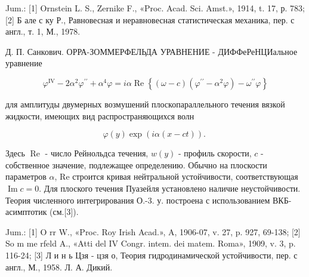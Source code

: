 \documentclass[10pt]{article}
\begin{document}
Jum.: [1] Ornstein L. S., Zernike F., «Proc. Acad. Sci. Amst.», 1914, t. 17, р. 783; [2] Б але с ку Р., Равновесная и неравновесная статистическая механика, пер. с англ., т. 1, М., 1978.



Д. П. Санкович. ОРРА-ЗОММЕРФЕЛЬДА УРАВНЕНИЕ - ДИФФеРеНЦИальное уравнение



\[

\varphi^{\mathrm{IV}}-2 \alpha^{2} \varphi^{\prime \prime}+\alpha^{4} \varphi=i \alpha \operatorname{Re}\left\{(\omega-c)\left(\varphi^{\prime \prime}-\alpha^{2} \varphi\right)-\omega^{\prime \prime} \varphi\right\}

\]



для амплитуды двумерных возмушений плоскопараллельного течения вязкой жидкости, имеющих вид распространяющихся волн



\[

\varphi(y) \exp (i \alpha(x-c t)) \text {. }

\]



Здесь $\operatorname{Re}$ - число Рейнольдса течения, $w(y)$ - профиль скорости, $c$ - собственное значение, подлежащее определению. Обычно на плоскости параметров $\alpha$, Re строится кривая нейтральной устойчивости, соответствующая $\operatorname{Im} c=0$. Для плоского течения Пуазейля установлено наличие неустойчивости. Теория численного интегрирования О.-3. у. построена с использованием ВКБ-асимптотик (см.[3]).



Jum.: [1] O rr W., «Proc. Roy Irish Acad.», A, 1906-07, v. 27, p. 927, 69-138; [2] So m me rfeld A., «Atti del IV Congr. intem. dei matem. Roma», 1909, v. 3, p. 116-24; [3] Л и н ь Цзя - цзя о, Теория гидродинамической устойчивости, пер. с англ., М., 1958. Л. А. Дикий.
\end{document}
